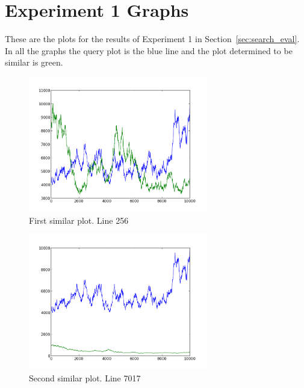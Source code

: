 \clearpage

\section{Experiment 1 Graphs}
\label{sec:experiment1}

These are the plots for the results of Experiment 1 in Section~\ref{sec:search_eval}.  In all the graphs the query plot is the blue line and the plot determined to be similar is green.

\begin{figure}[h!]
    \centering
    \includegraphics[width=0.7\textwidth]{images/256.png}
    \caption{First similar plot.  Line 256}
    \label{fig:ex1_1}
\end{figure}

\begin{figure}[h!]
    \centering
    \includegraphics[width=0.7\textwidth]{images/7017.png}
    \caption{Second similar plot.  Line 7017}
    \label{fig:ex1_2}
\end{figure}

